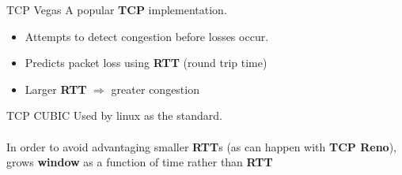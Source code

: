 \hfill
\begin{minipage}{0.55\textwidth}
    \begin{itemize}
    \end{itemize}
\end{minipage}
\begin{definitionbox}{TCP Vegas}
    A popular \textbf{TCP} implementation.
    \begin{itemize}
        \setlength\itemsep{0em}
        \item Attempts to detect congestion before losses occur.
        \item Predicts packet loss using \textbf{RTT} (round trip time)
        \item Larger \textbf{RTT} $\Rightarrow$ greater congestion
    \end{itemize}
\end{definitionbox}
\begin{definitionbox}{TCP CUBIC}
    Used by linux as the standard.
    \\
    \\ In order to avoid advantaging smaller \textbf{RTT}s (as can happen with \textbf{TCP Reno}), grows \textbf{window} as a function of time rather than \textbf{RTT}
\end{definitionbox}

